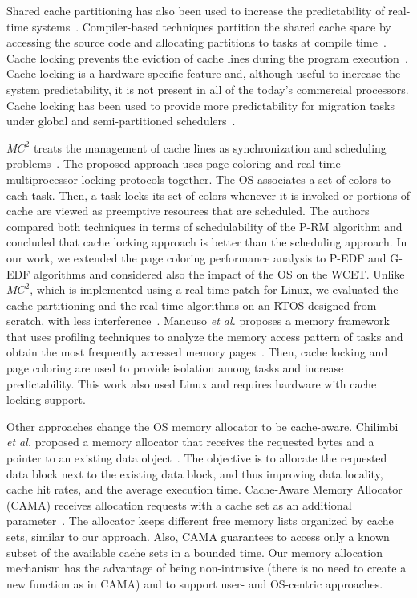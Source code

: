 \documentclass[10pt, conference, compsocconf]{IEEEtran}
\begin{document}
Shared cache partitioning has also been used to increase the predictability of real-time systems~\cite{Liedtke:1997,Chousein:2005,Guan:2009}. Compiler-based techniques partition the shared cache space by accessing the source code and allocating partitions to tasks at compile time~\cite{Vera:2003}. Cache locking prevents the eviction of cache lines during the program execution~\cite{Aparicio:2012,Sarkar:2012}. Cache locking is a hardware specific feature and, although useful to increase the system predictability, it is not present in all of the today's commercial processors. Cache locking has been used to provide more predictability for migration tasks under global and semi-partitioned schedulers~\cite{Sarkar:2011,Shekhar:2012}.

$MC^2$ treats the management of cache lines as synchronization and scheduling problems~\cite{Kenna:2013}. The proposed approach uses page coloring and real-time multiprocessor locking protocols together. The OS associates a set of colors to each task. Then, a task locks its set of colors whenever it is invoked or portions of cache are viewed as preemptive resources that are scheduled. The authors compared both techniques in terms of schedulability of the P-RM algorithm and concluded that cache locking approach is better than the scheduling approach. In our work, we extended the page coloring performance analysis to P-EDF and G-EDF algorithms and considered also the impact of the OS on the WCET. Unlike $MC^2$, which is implemented using a real-time patch for Linux, we evaluated the cache partitioning and the real-time algorithms on an RTOS designed from scratch, with less interference~\cite{Gracioli:2013}. Mancuso \textit{et al.} proposes a memory framework that uses profiling techniques to analyze the memory access pattern of tasks and obtain the most frequently accessed memory pages~\cite{Mancuso:2013}. Then, cache locking and page coloring are used to provide isolation among tasks and increase predictability. This work also used Linux and requires hardware with cache locking support.	

Other approaches change the OS memory allocator to be cache-aware. Chilimbi \textit{et al.} proposed a memory allocator that receives the requested bytes and a pointer to an existing data object~\cite{Chilimbi:2000}. The objective is to allocate the requested data block next to the existing data block, and thus improving data locality, cache hit rates, and the average execution time. Cache-Aware Memory Allocator (CAMA) receives allocation requests with a cache set as an additional parameter~\cite{Herter:2011}. The allocator keeps different free memory lists organized by cache sets, similar to our approach. Also, CAMA guarantees to access only a known subset of the available cache sets in a bounded time. Our memory allocation mechanism has the advantage of being non-intrusive (there is no need to create a new function as in CAMA) and to support user- and OS-centric approaches.
\end{document}
